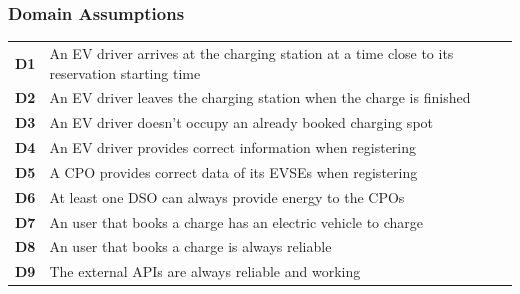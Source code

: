 \subsubsection{Domain Assumptions}
\begin{table}[H]
      \begin{tabularx}{\textwidth}{cX}
            \toprule
            \textbf{D1} & An EV driver arrives at the charging station at a time close to its reservation starting time \\
            \textbf{D2} & An EV driver leaves the charging station when the charge is finished                          \\
            \textbf{D3} & An EV driver doesn't occupy an already booked charging spot                                   \\
            \textbf{D4} & An EV driver provides correct information when registering                                    \\
            \textbf{D5} & A CPO provides correct data of its EVSEs when registering                                     \\
            \textbf{D6} & At least one DSO can always provide energy to the CPOs                                        \\
            \textbf{D7} & An user that books a charge has an electric vehicle to charge                                 \\
            \textbf{D8} & An user that books a charge is always reliable                                                \\
            \textbf{D9} & The external APIs are always reliable and working                                             \\
            \bottomrule
      \end{tabularx}
\end{table}
